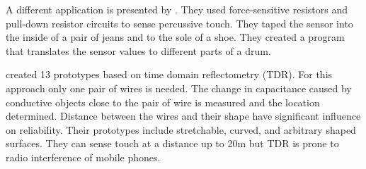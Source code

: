 A different application is presented by \cite{Smus:2010:UDT:1753846.1754094}. They used force-sensitive resistors and pull-down resistor circuits to sense percussive touch. They taped the sensor into the inside of a pair of jeans and to the sole of a shoe. They created a program that translates the sensor values to different parts of a drum. 

\citep{Wimmer:2011:MDT:2047196.2047264} created 13 prototypes based on time domain reflectometry (TDR). For this approach only one pair of wires is needed. The change in capacitance caused by conductive objects close to the pair of wire is measured and the location determined. Distance between the wires and their shape have significant influence on reliability. Their prototypes include stretchable, curved, and arbitrary shaped surfaces. They can sense touch at a distance up to 20m but TDR is prone to radio interference of mobile phones. 

